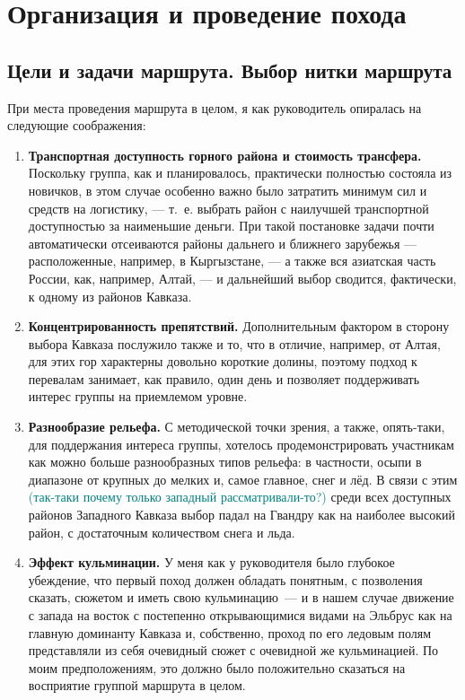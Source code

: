 \section{Организация и проведение похода}
\subsection{Цели и задачи маршрута. Выбор нитки маршрута}
При места проведения маршрута в целом, я как руководитель опиралась на следующие соображения: 
\begin{enumerate} 
	\item \textbf{Транспортная доступность горного района и стоимость трансфера.}
	Поскольку группа, как и планировалось, практически полностью состояла из новичков, в этом случае особенно важно было затратить минимум сил и средств на логистику, --- т.~е. выбрать район с наилучшей транспортной доступностью за наименьшие деньги. При такой постановке задачи почти автоматически отсеиваются районы дальнего и ближнего зарубежья --- расположенные, например, в Кыргызстане, --- а также вся азиатская часть России, как, например, Алтай, --- и дальнейший выбор сводится, фактически, к одному из районов Кавказа. 
	
	\item \textbf{Концентрированность препятствий.}
	Дополнительным фактором в сторону выбора Кавказа послужило также и то, что в отличие, например, от Алтая, для этих гор характерны довольно короткие долины, поэтому подход к перевалам занимает, как правило, один день и позволяет поддерживать интерес группы на приемлемом уровне.
	
	\item \textbf{Разнообразие рельефа.} 
	С методической точки зрения, а также, опять-таки, для поддержания интереса группы, хотелось продемонстрировать участникам как можно больше разнообразных типов рельефа: в частности, осыпи в диапазоне от крупных до мелких и, самое главное, снег и лёд. В связи с этим \textcolor{teal}{(так-таки почему только западный рассматривали-то?)} среди всех доступных районов Западного Кавказа выбор падал на Гвандру как на наиболее высокий район, с достаточным количеством снега и льда. 
	
	\item \textbf{Эффект кульминации.}
	У меня как у руководителя было глубокое убеждение, что первый поход должен обладать понятным, с позволения сказать, сюжетом и иметь свою кульминацию~--- и в нашем случае движение с запада на восток с постепенно открывающимися видами на Эльбрус как на главную доминанту Кавказа и, собственно, проход по его ледовым полям представляли из себя очевидный сюжет с очевидной же кульминацией. По моим предположениям, это должно было положительно сказаться на восприятие группой  маршрута в целом. 
	

\end{enumerate}
